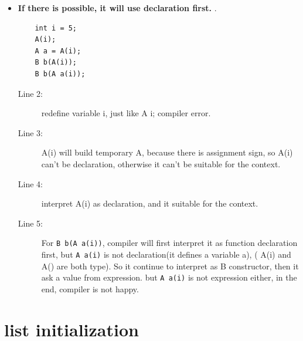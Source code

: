 \documentclass[a4paper,11pt,twoside]{book}
\begin{document}
\begin{itemize}
	\item \textbf{If there is possible, it will use declaration first. }.
\begin{lstlisting}
	int i = 5;
	A(i);
	A a = A(i);
	B b(A(i));
	B b(A a(i));
\end{lstlisting}	
	\begin{description}
		\item[Line 2:] redefine variable i, just like A i; compiler error.
		
		\item[Line 3:] A(i) will build temporary A, because there is assignment sign, so A(i) can't be declaration, otherwise it can't be suitable for the context.
		
		\item[Line 4:] interpret A(i) as declaration, and it suitable for the context.
		
		\item[Line 5:] For \texttt{B b(A a(i))}, compiler will first interpret it as function declaration first, but \texttt{A a(i)} is not declaration(it defines a variable a), ( A(i) and A() are both type). So it continue to interpret as B constructor, then it ask a value from expression. but \texttt{A a(i)} is not expression either, in the end, compiler is not happy. 
	\end{description}
			
\end{itemize}





\section{list initialization}
\end{document}
